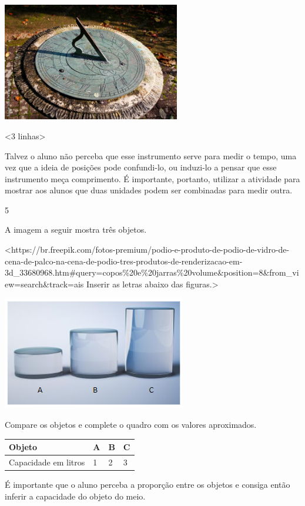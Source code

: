 {\includegraphics[width=3.05208in,height=2.03472in]{media/image45.jpeg}

\textless{}3 linhas\textgreater{}

Talvez o aluno não perceba que esse instrumento serve para
medir o tempo, uma vez que a ideia de posições pode confundi-lo, ou
induzi-lo a pensar que esse instrumento meça comprimento. É importante,
portanto, utilizar a atividade para mostrar aos alunos que duas
unidades podem ser combinadas para medir outra.

\num{5}

A imagem a seguir mostra três objetos.

\textless{}https://br.freepik.com/fotos-premium/podio-e-produto-de-podio-de-vidro-de-cena-de-palco-na-cena-de-podio-tres-produtos-de-renderizacao-em-3d\_33680968.htm\#query=copos\%20e\%20jarras\%20volume\&position=8\&from\_view=search\&track=ais
Inserir as letras abaixo das figuras.\textgreater{}

\includegraphics[width=3.14583in,height=1.94792in]{media/image46.png}

Compare os objetos e complete o quadro com os valores aproximados.

\begin{longtable}[]{@{}llll@{}}
\toprule
Objeto & A & B & C\tabularnewline
\midrule
\endhead
Capacidade em litros & 1 & 2 & 3\tabularnewline
\bottomrule
\end{longtable}

É importante que o aluno perceba a proporção entre os
objetos e consiga então inferir a capacidade do objeto do meio.

}
